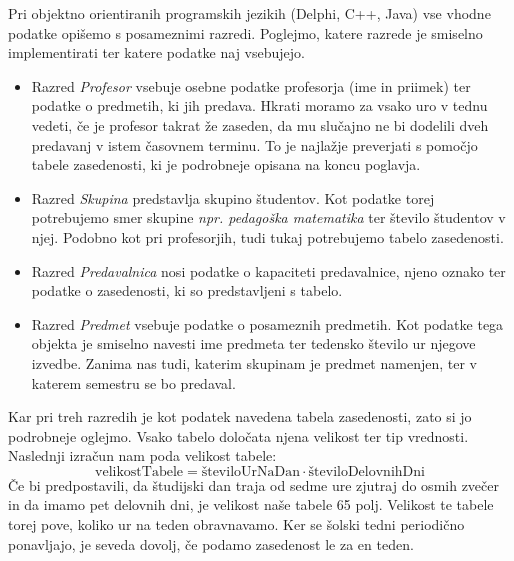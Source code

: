 \documentclass[a4paper,10pt]{article}
\begin{document}
Pri objektno orientiranih programskih jezikih (Delphi, C++, Java) vse vhodne podatke
opišemo s posameznimi razredi. Poglejmo, katere razrede je smiselno implementirati ter
katere podatke naj vsebujejo.


\begin{itemize}
   \item Razred \emph {Profesor} vsebuje osebne podatke profesorja (ime in priimek) ter
   podatke o predmetih, ki jih predava. Hkrati moramo za vsako uro v tednu vedeti, če
   je profesor takrat že zaseden, da mu slučajno ne bi dodelili dveh predavanj v istem
   časovnem terminu. To je najlažje preverjati s pomočjo tabele zasedenosti, ki je
   podrobneje opisana na koncu poglavja.

   \item Razred \emph {Skupina} predstavlja skupino študentov. Kot podatke torej potrebujemo
   smer skupine \emph{npr. pedagoška matematika} ter število študentov v njej. Podobno kot pri
   profesorjih, tudi tukaj potrebujemo tabelo zasedenosti.

   \item Razred \emph {Predavalnica} nosi podatke o kapaciteti predavalnice, njeno oznako
   ter podatke o zasedenosti, ki so predstavljeni s tabelo.

   \item Razred \emph {Predmet} vsebuje podatke o posameznih predmetih. Kot podatke tega
   objekta je smiselno navesti ime predmeta ter tedensko število ur njegove izvedbe.
   Zanima nas tudi, katerim skupinam je predmet namenjen, ter v katerem semestru se bo
   predaval.
\end{itemize}
Kar pri treh razredih je kot podatek navedena tabela zasedenosti, zato si jo podrobneje
oglejmo. Vsako tabelo določata njena velikost ter tip vrednosti. Naslednji izračun nam
poda velikost tabele:
 \[ \text{velikostTabele} = \text{številoUrNaDan} \cdot \text{številoDelovnihDni} \]
Če bi predpostavili, da študijski dan traja od sedme ure zjutraj do osmih zvečer in da
imamo pet delovnih dni, je velikost naše tabele 65 polj. Velikost te tabele torej pove,
koliko ur na teden obravnavamo. Ker se šolski tedni periodično ponavljajo, je seveda
dovolj, če podamo zasedenost le za en teden.
\end{document}
